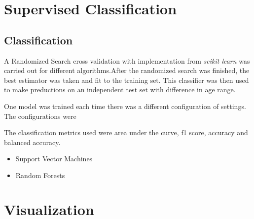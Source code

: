 \documentclass[msthesis.tex]{subfiles}
\begin{document}
\section{Supervised Classification}

\subsection{Classification}
A Randomized Search cross validation with implementation from \textit{scikit learn} was carried out for different algorithms.After the randomized search was finished, the best estimator was taken and fit to the training set. This classifier was then used to make preductions on an independent test set with difference in age range.

One model was trained each time there was a different configuration of settings. The configurations were 

The classification metrics used were area under the curve, f1 score, accuracy and balanced accuracy.  
\begin{itemize}
    \item Support Vector Machines
    \item Random Forests

\end{itemize}


\section{Visualization}
\end{document}
